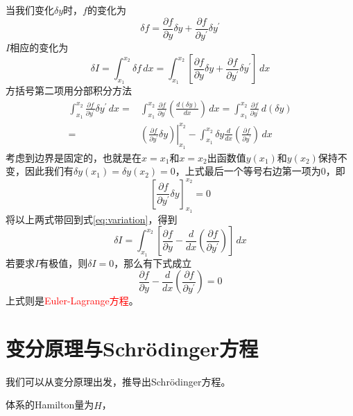 当我们变化$\delta y$时，$f$的变化为
\begin{equation}
	\delta f = \frac{\partial f}{\partial y} \delta y + \frac{\partial f}{\partial y^{\prime}} \delta y^{\prime}
\end{equation} 
$I$相应的变化为
\begin{equation}
	\delta I = \int_{x_1}^{x_2} \delta f \, dx = \int_{x_1}^{x_2} \left[  \frac{\partial f}{\partial y} \delta y + \frac{\partial f}{\partial y^{\prime}} \delta y^{\prime} \right] \, dx	\label{eq:variation}
\end{equation} 
方括号第二项用分部积分方法
\begin{equation}
	\begin{aligned}
		\int_{x_1}^{x_2} \frac{\partial f}{\partial y^{\prime}} \delta y^{\prime}\, dx =&{} \int_{x_1}^{x_2} \frac{\partial f}{\partial y^{\prime}} \left( \frac{d (\delta y)}{dx} \right) \, dx = \int_{x_1}^{x_2} \frac{\partial f}{\partial y^{\prime}} \, d (\delta y)	\\
		=&{} \left. \left( \frac{\partial f}{\partial y^{\prime}} \delta y \right) \right|_{x_1}^{x_2} - \int_{x_1}^{x_2} \delta y \frac{d}{dx}\left( \frac{\partial f}{\partial y^{\prime}} \right) \, dx
	\end{aligned}
\end{equation} 
考虑到边界是固定的，也就是在$x=x_1$和$x=x_2$出函数值$y(x_1)$和$y(x_2)$保持不变，因此我们有$\delta y(x_1) = \delta y(x_2) = 0$，上式最后一个等号右边第一项为0，即
\begin{equation}
	\left[ \frac{\partial f}{\partial y^{\prime}} \delta y \right]_{x_1}^{x_2} = 0
\end{equation}
将以上两式带回到式\eqref{eq:variation}，得到
\begin{equation}
	\delta I = \int_{x_1}^{x_2} \left[ \frac{\partial f}{\partial y} - \frac{d}{dx}\left( \frac{\partial f}{\partial y^{\prime}} \right) \right] \, dx
\end{equation} 
若要求$I$有极值，则$\delta I = 0$，那么有下式成立
\begin{equation}
    \frac{\partial f}{\partial y} - \frac{d}{dx}\left( \frac{\partial f}{\partial y^{\prime}} \right) = 0
\end{equation} 
上式则是\textcolor{red}{Euler-Lagrange方程}。

\section{变分原理与Schr\"{o}dinger方程}
我们可以从变分原理出发，推导出Schr\"{o}dinger方程。

体系的Hamilton量为$\hat{H}$，


